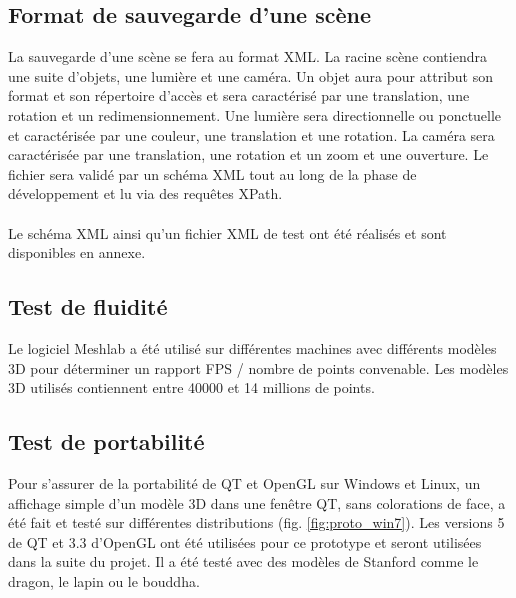 \subsection{Format de sauvegarde d'une scène}

La sauvegarde d’une scène se fera au format XML. La racine scène contiendra une suite d’objets, une lumière et une caméra. Un objet aura pour attribut son format et son répertoire d’accès et sera caractérisé par une translation, une rotation et un redimensionnement. Une lumière sera directionnelle ou ponctuelle et caractérisée par une couleur, une translation et une rotation. La caméra sera caractérisée par une translation, une rotation et un zoom et une ouverture. Le fichier sera validé par un schéma XML tout au long de la phase de développement et lu via des requêtes XPath.

\paragraph{}
Le schéma XML ainsi qu’un fichier XML de test ont été réalisés et sont disponibles en annexe.

\subsection{Test de fluidité}

Le logiciel Meshlab a été utilisé sur différentes machines avec différents modèles 3D pour déterminer un rapport FPS / nombre de points convenable. Les modèles 3D utilisés contiennent entre 40000 et 14 millions de points.

\subsection{Test de portabilité}

Pour s’assurer de la portabilité de QT et OpenGL sur Windows et Linux, un affichage simple d’un modèle 3D dans une fenêtre QT, sans colorations de face, a été fait et testé sur différentes distributions (fig. \ref{fig:proto_win7}). Les versions 5 de QT et 3.3 d’OpenGL ont été utilisées pour ce prototype et seront utilisées dans la suite du projet. Il a été testé avec des modèles de Stanford comme le dragon, le lapin ou le bouddha.


